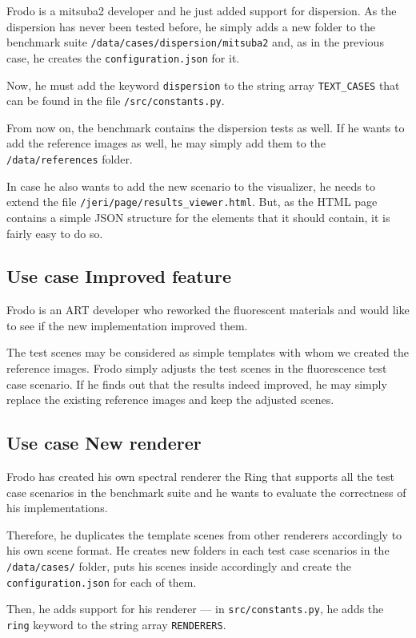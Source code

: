 Frodo is a mitsuba2 developer and he just added support for dispersion. As the dispersion has never been tested before, he simply adds a new folder to the benchmark suite \texttt{/data/cases/dispersion/mitsuba2} and, as in the previous case, he creates the \texttt{configuration.json} for it.

Now, he must add the keyword \texttt{dispersion} to the string array \texttt{TEXT\_CASES} that can be found in the file \texttt{/src/constants.py}.

From now on, the benchmark contains the dispersion tests as well. If he wants to add the reference images as well, he may simply add them to the \texttt{/data/references} folder.

In case he also wants to add the new scenario to the visualizer, he needs to extend the file \texttt{/jeri/page/results\_viewer.html}. But, as the HTML page contains a simple JSON structure for the elements that it should contain, it is fairly easy to do so.

\subsection{Use case Improved feature}

Frodo is an ART developer who reworked the fluorescent materials and would like to see if the new implementation improved them.

The test scenes may be considered as simple templates with whom we created the reference images. Frodo simply adjusts the test scenes in the fluorescence test case scenario. If he finds out that the results indeed improved, he may simply replace the existing reference images and keep the adjusted scenes.

\subsection{Use case New renderer}

Frodo has created his own spectral renderer the Ring that supports all the test case scenarios in the benchmark suite and he wants to evaluate the correctness of his implementations.

Therefore, he duplicates the template scenes from other renderers accordingly to his own scene format. He creates new folders in each test case scenarios in the \texttt{/data/cases/} folder, puts his scenes inside accordingly and create the \texttt{configuration.json} for each of them.

Then, he adds support for his renderer --- in \texttt{src/constants.py}, he adds the \texttt{ring} keyword to the string array \texttt{RENDERERS}.

